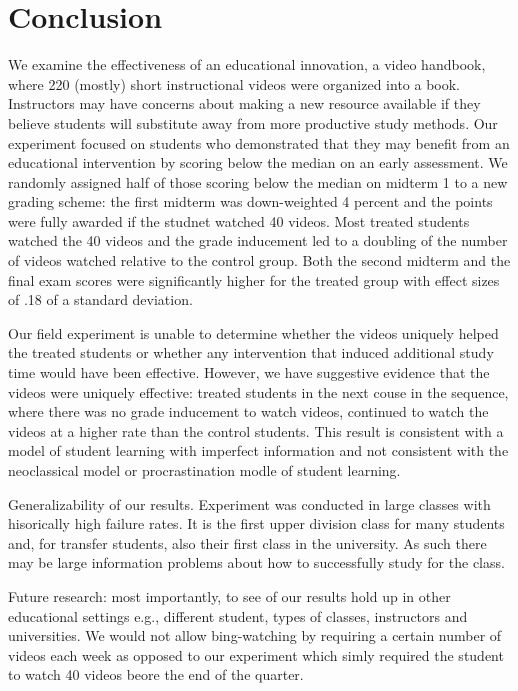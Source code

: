 \documentclass[12pt]{article}
\begin{document}
\section{Conclusion} \label{conclusion}

We examine the effectiveness of an educational innovation, a video handbook, where 220 (mostly) short instructional videos were organized into a book. Instructors may have concerns about making a new resource available if they believe students will substitute away from more productive study methods. Our experiment focused on students who demonstrated that they may benefit from an educational intervention by scoring below the median on an early assessment. We randomly assigned half of those scoring below the median on midterm 1 to a new grading scheme: the first midterm was down-weighted 4 percent and the points were fully awarded if the studnet watched 40 videos. Most treated students watched the 40 videos and the grade inducement led to a doubling of the number of videos watched relative to the control group. Both the second midterm and the final exam scores were significantly higher for the treated group with effect sizes of .18 of a standard deviation.

Our field experiment is unable to determine whether the videos uniquely helped the treated students or whether any intervention that induced additional study time would have been effective. However, we have suggestive evidence that the videos were uniquely effective: treated students in the next couse in the sequence, where there was no grade inducement to watch videos, continued to watch the videos at a higher rate than the control students. This result is consistent with a model of student learning with imperfect information and not consistent with the neoclassical model or procrastination modle of student learning.

Generalizability of our results. Experiment was conducted in large classes with hisorically high failure rates. It is the first upper division class for many students and, for transfer students, also their first class in the university. As such there may be large information problems about how to successfully study for the class.

Future research: most importantly, to see of our results hold up in other educational settings e.g., different student, types of classes, instructors and universities. We would not allow bing-watching by requiring a certain number of videos each week as opposed to our experiment which simly required the student to watch 40 videos beore the end of the quarter.
\end{document}
